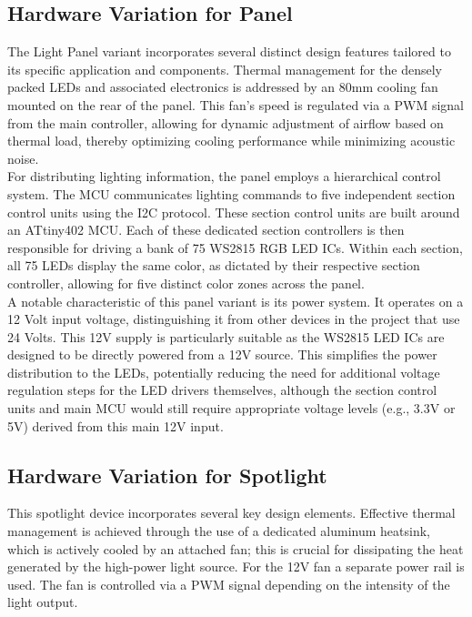 \subsection{Hardware Variation for Panel}
The Light Panel variant incorporates several distinct design features tailored to its specific application and components. Thermal management for the densely packed \ac{LED}s and associated electronics is addressed by an 80mm cooling fan mounted on the rear of the panel. This fan's speed is regulated via a \ac{PWM} signal from the main controller, allowing for dynamic adjustment of airflow based on thermal load, thereby optimizing cooling performance while minimizing acoustic noise. \\

For distributing lighting information, the panel employs a hierarchical control system. The \ac{MCU} communicates lighting commands to five independent section control units using the \ac{I2C} protocol. These section control units are built around an ATtiny402 \ac{MCU}. Each of these dedicated section controllers is then responsible for driving a bank of 75 WS2815 \ac{RGB} \ac{LED} \ac{IC}s. Within each section, all 75 \ac{LED}s display the same color, as dictated by their respective section controller, allowing for five distinct color zones across the panel. \\

A notable characteristic of this panel variant is its power system. It operates on a 12 Volt input voltage, distinguishing it from other devices in the project that use 24 Volts. This 12V supply is particularly suitable as the WS2815 \ac{LED} \ac{IC}s are designed to be directly powered from a 12V source. This simplifies the power distribution to the \ac{LED}s, potentially reducing the need for additional voltage regulation steps for the \ac{LED} drivers themselves, although the section control units and main \ac{MCU} would still require appropriate voltage levels (e.g., 3.3V or 5V) derived from this main 12V input.

\subsection{Hardware Variation for Spotlight}
This spotlight device incorporates several key design elements. Effective thermal management is achieved through the use of a dedicated aluminum heatsink, which is actively cooled by an attached fan; this is crucial for dissipating the heat generated by the high-power light source. For the 12V fan a separate power rail is used. The fan is controlled via a \ac{PWM} signal depending on the intensity of the light output.\\

